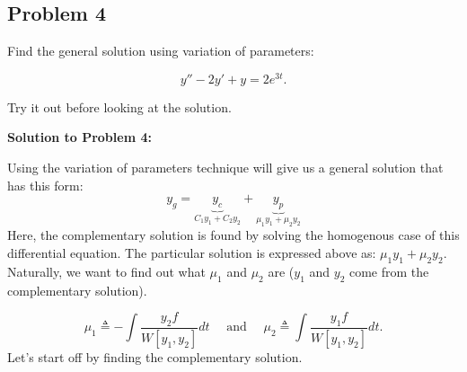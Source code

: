 \documentclass[a4paper,12pt]{article}
\begin{document}
\pagebreak

\subsection*{Problem 4} Find the general solution using variation of parameters:

$$ y''-2y'+y=2e^{3t}. $$

Try it out before looking at the solution.
\pagebreak

\textbf{Solution to Problem 4:}

Using the variation of parameters technique will give us a general solution that has this form:
$$ y_g = \underbrace{y_c}_{C_1y_1 + C_2y_2} + \underbrace{y_p}_{\mu_1y_1 + \mu_2y_2} $$
Here, the complementary solution is found by solving the homogenous case of this differential equation. The particular solution is expressed above as: $\mu_1y_1 + \mu_2y_2$. Naturally, we want to find out what $\mu_1$ and $\mu_2$ are ($y_1$ and $y_2$ come from the complementary solution). 

$$ \mu_1 \triangleq -\int \frac{y_2 f}{W[y_1, y_2]} dt \quad\text{ and }\quad \mu_2 \triangleq \int \frac{y_1 f}{W[y_1, y_2]} dt. $$
Let's start off by finding the complementary solution.\\
\end{document}
